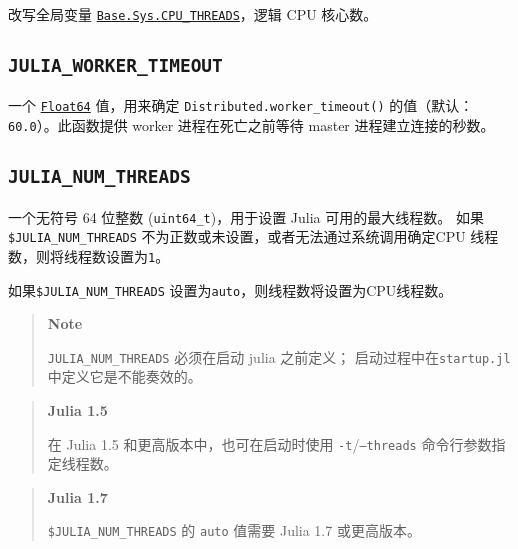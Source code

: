 改写全局变量 \hyperlink{5072616208401232599}{\texttt{Base.Sys.CPU\_THREADS}}，逻辑 CPU 核心数。



\hypertarget{17625390316676574932}{}


\subsection{\texttt{JULIA\_WORKER\_TIMEOUT}}



一个 \hyperlink{5027751419500983000}{\texttt{Float64}} 值，用来确定 \texttt{Distributed.worker\_timeout()} 的值（默认：\texttt{60.0}）。此函数提供 worker 进程在死亡之前等待 master 进程建立连接的秒数。



\hypertarget{7328254851646027731}{}


\subsection{\texttt{JULIA\_NUM\_THREADS}}



一个无符号 64 位整数 (\texttt{uint64\_t})，用于设置 Julia 可用的最大线程数。 如果\texttt{\$JULIA\_NUM\_THREADS} 不为正数或未设置，或者无法通过系统调用确定CPU 线程数，则将线程数设置为\texttt{1}。



如果\texttt{\$JULIA\_NUM\_THREADS} 设置为\texttt{auto}，则线程数将设置为CPU线程数。



\begin{quote}
\textbf{Note}

\texttt{JULIA\_NUM\_THREADS} 必须在启动 julia 之前定义； 启动过程中在\texttt{startup.jl} 中定义它是不能奏效的。

\end{quote}


\begin{quote}
\textbf{Julia 1.5}

在 Julia 1.5 和更高版本中，也可在启动时使用 \texttt{-t}/\texttt{--threads} 命令行参数指定线程数。

\end{quote}


\begin{quote}
\textbf{Julia 1.7}

\texttt{\$JULIA\_NUM\_THREADS} 的 \texttt{auto} 值需要 Julia 1.7 或更高版本。

\end{quote}


